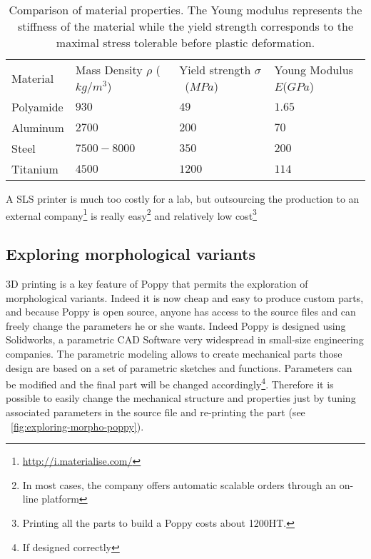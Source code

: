 \begin{table}[h]
    \centering
    \begin{tabularx}{0.8\linewidth }{l X X X}
        Material & Mass Density $\rho$ ($kg/m^3$) &  Yield strength $\sigma$~($MPa$) & Young Modulus $E$($GPa$)\\
        Polyamide & $930$ & $49$ & $1.65$\\

        Aluminum & $2700$ & $200$ & $70$\\

        Steel & $7500-8000$ & $350$ & $200$\\

        Titanium & $4500$ & $1200$ & $114$\\

    \end{tabularx}

    \caption{Comparison of material properties.
    The Young modulus represents the stiffness of the material while the yield strength corresponds to the maximal stress tolerable before plastic deformation.}
    \label{tab:materials}
\end{table}

A SLS printer is much too costly for a lab, but outsourcing the production to an external company\footnote{\url{http://i.materialise.com/}} is really easy\footnote{In most cases, the company offers automatic scalable orders through an on-line platform} and relatively low cost\footnote{Printing all the parts to build a Poppy costs about 1200\texteuro HT.}

\subsection{Exploring morphological variants} %


3D printing is a key feature of Poppy that permits the exploration of morphological variants. Indeed it is now cheap and easy to produce custom parts, and because Poppy is open source, anyone has access to the source files and can freely change the parameters he or she wants. Indeed Poppy is designed using Solidworks, a parametric CAD Software very widespread in small-size engineering companies. The parametric modeling allows to create mechanical parts those design are based on a set of parametric sketches and functions. Parameters can be modified and the final part will be changed accordingly\footnote{If designed correctly}. Therefore it is possible to easily change the mechanical structure and properties just by tuning associated parameters in the source file and re-printing the part (see \figurename~\ref{fig:exploring-morpho-poppy}).

